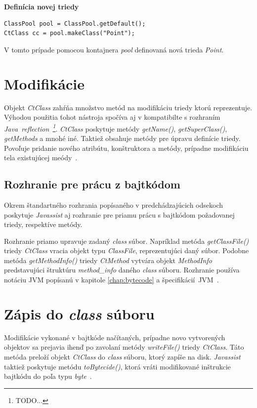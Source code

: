 \documentclass[11pt,final,oneside]{fithesis}
\newenvironment{example}[1]
{
\vspace{3mm}
\noindent\textbf{#1}
\vspace{2mm}
}
{
\vspace{3mm}
}
\begin{document}
\begin{example}{Definícia novej triedy}
\begin{verbatim}
ClassPool pool = ClassPool.getDefault();
CtClass cc = pool.makeClass("Point");
\end{verbatim}
\end{example}

V tomto prípade pomocou kontajnera \textit{pool} definovaná nová trieda
\textit{Point}. 

\section{Modifikácie}

\label{sec:mod}
Objekt \textit{CtClass} zahŕňa množstvo metód na modifikáciu triedy ktorú reprezentuje. Výhodou použitia ťohot nástroja spočíva aj v kompatibilte s rozhraním \textit{Java~reflection~\footnote{TODO...}}. \textit{CtClass} poskytuje metódy \textit{getName()}, \textit{getSuperClass()}, \textit{getMethods} a mnohé iné. Taktiež obsahuje metódy pre úpravu definície triedy. Povoľuje pridanie nového atribútu, konštruktora a metódy, prípadne modifikáciu tela existujúcej meódy~\cite{Chiba:Javassist}.

\subsection{Rozhranie pre prácu z bajtkódom}

Okrem štandartného rozhrania popísaného v predchádzajúcich odsekoch poskytuje \textit{Javassist} aj rozhranie pre priamu prácu s bajtkódom požadovanej triedy, respektíve metódy.

Rozhranie priamo upravuje zadaný \textit{class} súbor. Napríklad metóda \textit{getClassFile()} triedy \textit{CtClass} vracia objekt typu \textit{ClassFile}, reprezentujúci daný súbor. Podobne metóda \textit{getMethodInfo()} triedy \textit{CtMethod} vytvára objekt \textit{MethodInfo} predstavujúci štruktúru \textit{method\_info} daného \textit{class} súboru. Rozhranie používa notáciu JVM popísanú v kapitole \ref{chap:bytecode} a špecifikácií~JVM~\cite{Lindholm:2013:JVM:2462629}.

\section{Zápis do \textit{class} súboru}

Modifikácie vykonané v bajtkóde načítaných, prípadne novo vytvorených objektov sa prejavia ihenď po zavolaní metódy \textit{writeFile()} triedy
\textit{CtClass}. Táto metóda preloží objekt \textit{CtClass} do \textit{class} súboru, ktorý zapíše na disk. \textit{Javassist} taktiež poskytuje metódu \textit{toBytecide()}, ktorá vráti modifikované inštrukcie bajtkódu do poľa typu \textit{byte}~\cite{Chiba:Javassist}.
\end{document}
